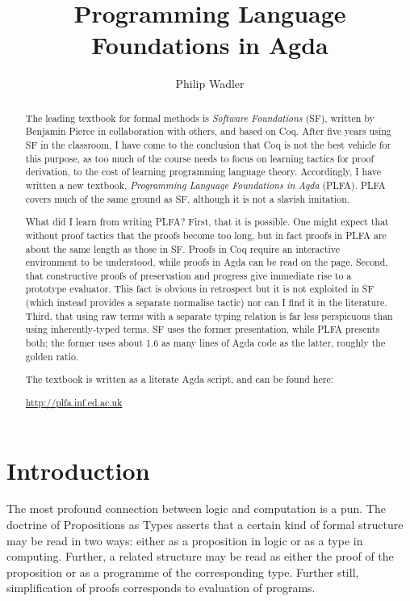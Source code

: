 \documentclass[runningheads]{llncs}
\begin{document}
\title{Programming Language Foundations in Agda}
\author{Philip Wadler}
\maketitle
%
\begin{abstract}
The leading textbook for formal methods is \emph{Software Foundations}
(SF), written by Benjamin Pierce in collaboration with others, and
based on Coq. After five years using SF in the classroom, I have come
to the conclusion that Coq is not the best vehicle for this purpose,
as too much of the course needs to focus on learning tactics for proof
derivation, to the cost of learning programming language theory.
Accordingly, I have written a new textbook, \emph{Programming Language
Foundations in Agda} (PLFA).  PLFA covers much of the same ground as
SF, although it is not a slavish imitation.

What did I learn from writing PLFA? First, that it is possible. One
might expect that without proof tactics that the proofs become too
long, but in fact proofs in PLFA are about the same length as those in
SF. Proofs in Coq require an interactive environment to be understood,
while proofs in Agda can be read on the page.  Second, that
constructive proofs of preservation and progress give immediate rise
to a prototype evaluator. This fact is obvious in retrospect but it is
not exploited in SF (which instead provides a separate normalise
tactic) nor can I find it in the literature.  Third, that using raw
terms with a separate typing relation is far less perspicuous than
using inherently-typed terms. SF uses the former presentation, while
PLFA presents both; the former uses about 1.6 as many lines of Agda
code as the latter, roughly the golden ratio.

The textbook is written as a literate Agda script, and can be found here:
\begin{center}
\url{http://plfa.inf.ed.ac.uk}
\end{center}
\end{abstract}

\section{Introduction}

The most profound connection between logic and computation is a pun.
The doctrine of Propositions as Types asserts that a certain kind of formal
structure may be read in two ways: either as a proposition in logic or
as a type in computing.  Further, a related structure may be read as
either the proof of the proposition or as a programme of the
corresponding type.  Further still, simplification of proofs
corresponds to evaluation of programs.
\end{document}
